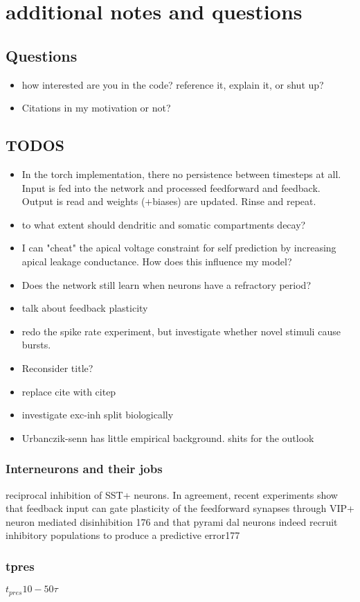 \chapter{additional notes and questions}

\section{Questions}


\begin{itemize}
    \item how interested are you in the code? reference it, explain it, or shut up?
    \item Citations in my motivation or not?
\end{itemize}


\section{TODOS}

\begin{itemize}
    \item In the torch implementation, there no persistence between timesteps at all. Input is fed into the network and
    processed feedforward and feedback. Output is read and weights (+biases) are updated. Rinse and repeat.
    \item to what extent should dendritic and somatic compartments decay?
    \item I can "cheat" the apical voltage constraint for self prediction by increasing apical leakage conductance. How
    does this influence my model?
    \item Does the network still learn when neurons have a refractory period?
    \item talk about feedback plasticity
    \item redo the spike rate experiment, but investigate whether novel stimuli cause bursts.
    \item Reconsider title?
    \item replace cite with citep
    \item investigate exc-inh split biologically
    \item Urbanczik-senn has little empirical background. shits for the outlook
\end{itemize}



\subsection{Interneurons and their jobs}




reciprocal inhibition of SST+ neurons. In agreement,
recent experiments show that feedback input can gate
plasticity of the feedforward synapses through VIP+
neuron mediated disinhibition 176 and that pyrami
dal neurons indeed recruit inhibitory populations to
produce a predictive error177 \citep{Poirazi2020}

\subsection{tpres}

$t_{pres} 10 - 50 \tau$
